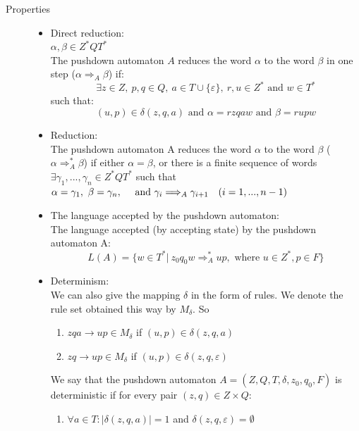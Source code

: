 \documentclass[margin=0px]{article}
\begin{document}
\begin{description}
    \item[Properties] \hfill
        \begin{itemize}
            \item Direct reduction: \\
                  $\alpha, \beta \in Z^*QT^*$\\
                  The pushdown automaton $A$ reduces the word $\alpha $ to the word $\beta$ in one step ($\alpha \Longrightarrow_A \beta$) if:
                  \[\exists z \in Z, \ p,q \in Q, \ a \in T \cup \{\varepsilon\}, \ r,u \in Z^* \textrm{ and } w\in T^*\]
                  such that:
                  \[(u,p) \in \delta(z,q,a) \textrm{ and } \alpha = rzqaw \textrm{ and } \beta = rupw\]
            \item Reduction: \\
                  The pushdown automaton A reduces the word $\alpha$ to the word $\beta$ ($\alpha \Longrightarrow_A^* \beta$) if either $\alpha = \beta$, or
                  there is a finite sequence of words $ \exists \gamma_1,...,\gamma_n \in Z^*QT^*$ such that $\alpha = \gamma_1, \ \beta = \gamma_n, \quad \textrm{ and } \quad \\ {\gamma_i \Longrightarrow_A \gamma_{i+1} \quad (i=1,...,n-1)}$
            \item The language accepted by the pushdown automaton: \\
                  The language accepted (by accepting state) by the pushdown automaton A:
                  \[L(A) = \{ w \in T^* | \ z_0q_0w \Longrightarrow_A^* up, \textrm{ where } u \in Z^*, p \in F \} \]
            \item Determinism: \\
                  We can also give the mapping $\delta$ in the form of rules. We denote the rule set obtained this way by $M_\delta$. So
                  \begin{enumerate}
                      \item $zqa \rightarrow up \in M_\delta$ if $(u, p) \in \delta(z, q, a)$
                      \item $zq \rightarrow up \in M_\delta$ if $(u, p) \in \delta(z, q, \varepsilon)$
                  \end{enumerate}

                  We say that the pushdown automaton $A = (Z,Q, T,\delta, z_0, q_0, F)$ is deterministic if for every pair $(z, q) \in Z \times Q$:
                  \begin{enumerate}
                      \item $\forall a \in T:  |\delta(z, q, a)| = 1$ and $\delta(z, q, \varepsilon) = \emptyset$


\end{enumerate}
\end{itemize}
\end{description}
\end{document}
